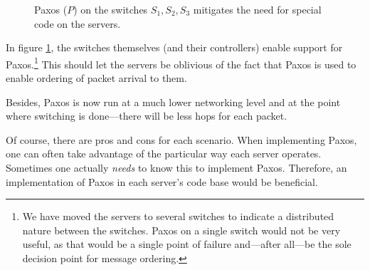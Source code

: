 \begin{figure}[H]
  \centering
  \caption{Paxos ($P$) on the switches $S_1, S_2, S_3$ mitigates the need for special code on the servers.}
  \label{figure:paxos.on.switches}
\end{figure}

In figure \ref{figure:paxos.on.switches}, the switches themselves (and their
controllers) enable
support for Paxos.\footnote{We have moved the servers to several switches
to indicate a distributed nature between the switches.
Paxos on a single switch would not be very useful, as that would be a single
point of failure and---after all---be the sole decision point for message
ordering.}
This should let the servers be oblivious of the fact that Paxos is used to
enable ordering of packet arrival to them.

Besides, Paxos is now run at a much lower networking level and at the point where switching is done---there will be less hops
for each packet.

Of course, there are pros and cons for each scenario.
When implementing Paxos, one can often take advantage of
the particular way each server operates. Sometimes one actually
\textit{needs} to know this to implement Paxos.  Therefore, an
implementation of Paxos in each server's code base would be beneficial.

